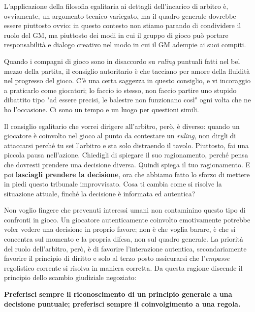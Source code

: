 
L'applicazione della filosofia egalitaria ai dettagli dell'incarico di arbitro è, ovviamente, un argomento tecnico variegato, ma il quadro generale dovrebbe essere piuttosto ovvio: in questo contesto non stiamo parando di condividere il ruolo del GM, ma piuttosto dei modi in cui il gruppo di gioco può portare responsabilità e dialogo creativo nel modo in cui il GM adempie ai suoi compiti.

Quando i compagni di gioco sono in disaccordo su \textit{ruling} puntuali fatti nel bel mezzo della partita, il consiglio autoritario è che tacciano per amore della fluidità nel progresso del gioco. C'è una certa saggezza in questo consiglio, e vi incoraggio a praticarlo come giocatori; lo faccio io stesso, non faccio partire uno stupido dibattito tipo "ad essere precisi, le balestre non funzionano così" ogni volta che ne ho l'occasione. Ci sono un tempo e un luogo per questioni simili.

Il consiglio egalitario che vorrei dirigere all'arbitro, però, è diverso: quando un giocatore è coinvolto nel gioco al punto da contestare un \textit{ruling}, non dirgli di attaccarsi perché tu sei l'arbitro e sta solo distraendo il tavolo. Piuttosto, fai una piccola pausa nell'azione. Chiedigli di spiegare il suo ragionamento, perché pensa che dovresti prendere una decisione diversa. Quindi spiega il tuo ragionamento. E poi \textbf{lasciagli prendere la decisione}, ora che abbiamo fatto lo sforzo di mettere in piedi questo tribunale improvvisato. Cosa ti cambia come si risolve la situazione attuale, finché la decisione è informata ed autentica?

Non voglio fingere che prevenuti interessi umani non contaminino questo tipo di confronti in gioco. Un giocatore autenticamente coinvolto emotivamente potrebbe voler vedere una decisione in proprio favore; non è che voglia barare, è che si concentra sul momento e la propria difesa, non sul quadro generale. La priorità del ruolo dell'arbitro, però, è di favorire l'interazione autentica, secondariamente favorire il principio di diritto e solo al terzo posto assicurarsi che l'\textit{empasse} regolistico corrente si risolva in maniera corretta. Da questa ragione discende il principio dello scambio giudiziale negoziato:

\textbf{Preferisci sempre il riconoscimento di un principio generale a una decisione puntuale; preferisci sempre il coinvolgimento a una regola.}

